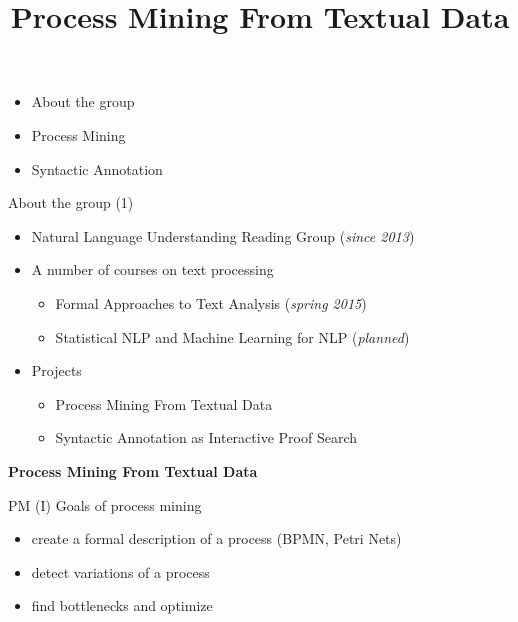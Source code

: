 \documentclass{beamer}
\begin{document}
\title{\Large{Process Mining From Textual Data}}
\author{}
\institute{}
\date{} 

\begin{frame}
    \thispagestyle{empty}
    \titlepage
\end{frame}

\begin{frame}{}
    \setcounter{framenumber}{1}
    \begin{itemize}
        \item About the group
        \item Process Mining
        \item Syntactic Annotation
    \end{itemize}
\end{frame}

\begin{frame}{About the group (1)}
\begin{itemize}
    \item Natural Language Understanding Reading Group (\textit{since 2013})
    \item A number of courses on text processing
        \begin{itemize}
            \item Formal Approaches to Text Analysis (\textit{spring 2015})
            \item Statistical NLP and Machine Learning for NLP (\textit{planned})
        \end{itemize}
    \item Projects
        \begin{itemize}
            \item Process Mining From Textual Data
            \item Syntactic Annotation as Interactive Proof Search
        \end{itemize}
\end{itemize}
\end{frame}

\begin{frame}{}
\begin{center}
	\textbf{Process Mining From Textual Data}
\end{center}
\end{frame}

\begin{frame}{PM (I)}
Goals of process mining\\
\bigskip
\begin{itemize}
    \item create a formal description of a process (BPMN, Petri Nets)
    \item detect variations of a process
    \item find bottlenecks and optimize
\end{itemize}
\end{frame}
\end{document}
